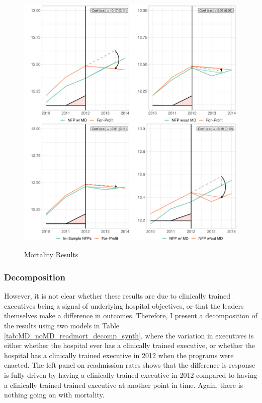 \documentclass[12pt]{article}
\begin{document}
      \begin{figure}
         \centering
         \caption{Mortality Results}
         \includegraphics[width=\textwidth]{Objects/mort_synth_plot.pdf}
         \label{fig:read_synth_plot}
     \end{figure}

    \subsubsection{Decomposition}

    However, it is not clear whether these results are due to clinically trained executives being a signal of underlying hospital objectives, or that the leaders themselves make a difference in outcomes. Therefore, I present a decomposition of the results using two models in Table \ref{tab:MD_noMD_readmort_decomp_synth}, where the variation in executives is either whether the hospital ever has a clinically trained executive, or whether the hospital has a clinically trained executive in 2012 when the programs were enacted. The left panel on readmission rates shows that the difference is response is fully driven by having a clinically trained executive in 2012 compared to having a clinically trained trained executive at another point in time. Again, there is nothing going on with mortality.  
\end{document}
